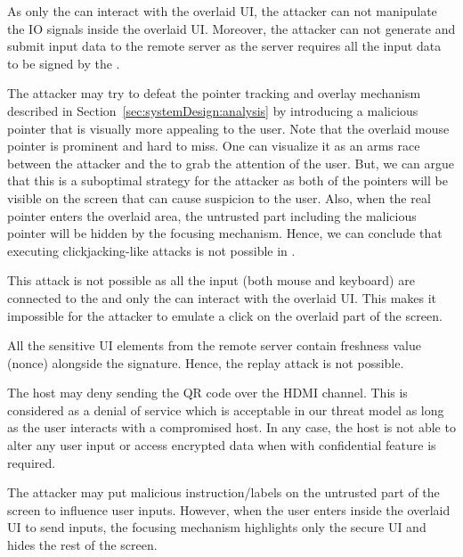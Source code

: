  As only the \device can interact with the overlaid UI, the attacker can not manipulate the IO signals inside the overlaid UI. Moreover, the attacker can not generate and submit input data to the remote server as the server requires all the input data to be signed by the \device.

The attacker may try to defeat the \name pointer tracking and overlay mechanism described in Section~\ref{sec:systemDesign:analysis} by introducing a malicious pointer that is visually more appealing to the user. Note that the \device overlaid mouse pointer is prominent and hard to miss. One can visualize it as an arms race between the attacker and the \device to grab the attention of the user. But, we can argue that this is a suboptimal strategy for the attacker as both of the pointers will be visible on the screen that can cause suspicion to the user. Also, when the real pointer enters the overlaid area, the untrusted part including the malicious pointer will be hidden by the focusing mechanism. Hence, we can conclude that executing clickjacking-like attacks is not possible in \name.

 This attack is not possible as all the input (both mouse and keyboard) are connected to the \device and only the \device can interact with the overlaid UI. This makes it impossible for the attacker to emulate a click on the overlaid part of the screen.  

 All the sensitive UI elements from the remote server contain freshness value (nonce) alongside the signature. Hence, the replay attack is not possible.

 The host may deny sending the QR code over the HDMI channel. This is considered as a denial of service which is acceptable in our threat model as long as the user interacts with a compromised host. 
In any case, the host is not able to alter any user input or access encrypted data when \name with confidential feature is required.

 The attacker may put malicious instruction/labels on the untrusted part of the screen to influence user inputs. However, when the user enters inside the overlaid UI to send inputs, the focusing mechanism highlights only the secure UI and hides the rest of the screen. 

